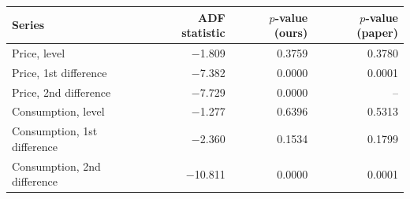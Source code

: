 \begin{tabular}{lrrr}
\toprule
Series & ADF statistic & $p$-value (ours) & $p$-value (paper) \\
\midrule
Price, level & $-$1.809 & 0.3759 & 0.3780 \\
Price, 1st difference & $-$7.382 & 0.0000 & 0.0001 \\
Price, 2nd difference & $-$7.729 & 0.0000 & -- \\
Consumption, level & $-$1.277 & 0.6396 & 0.5313 \\
Consumption, 1st difference & $-$2.360 & 0.1534 & 0.1799 \\
Consumption, 2nd difference & $-$10.811 & 0.0000 & 0.0001 \\
\bottomrule
\end{tabular}
